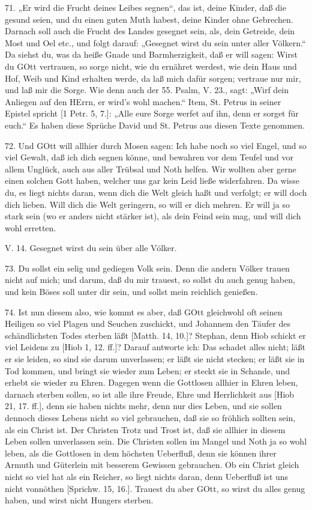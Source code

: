 71. „Er wird die Frucht deines Leibes segnen“, das ist, deine Kinder, daß die gesund seien, und du einen guten Muth habest, deine Kinder ohne Gebrechen. Darnach soll auch die Frucht des Landes gesegnet sein, als, dein Getreide, dein Most und Oel etc., und folgt darauf: „Gesegnet wirst du sein unter aller Völkern.“ Da siehst du, was da heiße Gnade und Barmherzigkeit, daß er will sagen: Wirst du GOtt vertrauen, so sorge nicht, wie du ernähret werdest, wie dein Haus und Hof, Weib und Kind erhalten werde, da laß mich dafür sorgen; vertraue nur mir, und laß mir die Sorge. Wie denn auch der 55. Psalm, V. 23., sagt: „Wirf dein Anliegen auf den HErrn, er wird’s wohl machen.“ Item, St. Petrus in seiner Epistel spricht [1 Petr. 5, 7.]: „Alle eure Sorge werfet auf ihn, denn er sorget für euch.“ Es haben diese Sprüche David und St. Petrus aus diesen Texte genommen.

72. Und GOtt will allhier durch Mosen sagen: Ich habe noch so viel Engel, und so viel Gewalt, daß ich dich segnen könne, und bewahren vor dem Teufel und vor allem Unglück, auch aus aller Trübsal und Noth helfen. Wir wollten aber gerne einen solchen Gott haben, welcher uns gar kein Leid ließe widerfahren. Da wisse du, es liegt nichts daran, wenn dich die Welt gleich haßt und verfolgt; er will doch dich lieben. Will dich die Welt geringern, so will er dich mehren. Er will ja so stark sein (wo er anders nicht stärker ist), als dein Feind sein mag, und will dich wohl erretten.

\begin{schriftzitat}
V. 14. Gesegnet wirst du sein über alle Völker.
\end{schriftzitat}

73. Du sollst ein selig und gediegen Volk sein. Denn die andern Völker trauen nicht auf mich; und darum, daß du mir trauest, so sollst du auch genug haben, und kein Böses soll unter dir sein, und sollst mein reichlich genießen.

74. Ist nun diesem also, wie kommt es aber, daß GOtt gleichwohl oft seinen Heiligen so viel Plagen und Seuchen zuschickt, und Johannem den Täufer des schändlichsten Todes sterben läßt [Matth. 14, 10.]? Stephan, denn Hiob schickt er viel Leidens zu [Hiob 1, 12. ff.]? Darauf antworte ich: Das schadet alles nicht; läßt er sie leiden, so sind sie darum unverlassen; er läßt sie nicht stecken; er läßt sie in Tod kommen, und bringt sie wieder zum Leben; er steckt sie in Schande, und erhebt sie wieder zu Ehren. Dagegen wenn die Gottlosen allhier in Ehren leben, darnach sterben sollen, so ist alle ihre Freude, Ehre und Herrlichkeit aus [Hiob 21, 17. ff.], denn sie haben nichts mehr, denn nur dies Leben, und sie sollen dennoch dieses Lebens nicht so viel gebrauchen, daß sie so fröhlich sollten sein, als ein Christ ist. Der Christen Trotz und Trost ist, daß sie allhier in diesem Leben sollen unverlassen sein. Die Christen sollen im Mangel und Noth ja so wohl leben, als die Gottlosen in dem höchsten Ueberfluß, denn sie können ihrer Armuth und Güterlein mit besserem Gewissen gebrauchen. Ob ein Christ gleich nicht so viel hat als ein Reicher, so liegt nichts daran, denn Ueberfluß ist uns nicht vonnöthen [Sprichw. 15, 16.]. Trauest du aber GOtt, so wirst du alles genug haben, und wirst nicht Hungers sterben.


